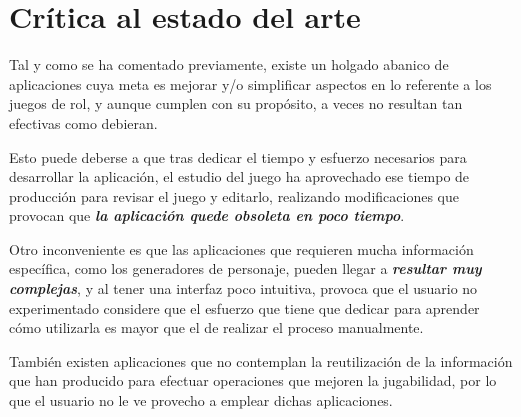 

\section{Crítica al estado del arte} \label{Critica_Estado_Arte}
Tal y como se ha comentado previamente, existe un holgado abanico de 
aplicaciones cuya meta es mejorar y/o simplificar aspectos en lo referente a 
los juegos de rol, y aunque cumplen con su propósito, a veces no resultan 
tan efectivas como debieran. 
\medskip 

Esto puede deberse a que tras dedicar el tiempo y esfuerzo necesarios para 
desarrollar la aplicación, el estudio del juego ha aprovechado ese tiempo 
de producción para revisar el juego y editarlo, realizando modificaciones 
que provocan que \emph{\textbf{la aplicación quede obsoleta en poco tiempo}}. 
\medskip

Otro inconveniente es que las aplicaciones que requieren mucha información 
específica, como los generadores de personaje, pueden llegar a 
\emph{\textbf{resultar muy complejas}}, y al tener una interfaz poco intuitiva, 
provoca que el usuario no experimentado considere que el esfuerzo que tiene que 
dedicar para aprender cómo utilizarla es mayor que el de realizar el proceso manualmente. \medskip

También existen aplicaciones que no contemplan la reutilización de la 
información que han producido para efectuar operaciones que mejoren 
la jugabilidad, por lo que el usuario no le ve provecho a emplear dichas
aplicaciones.